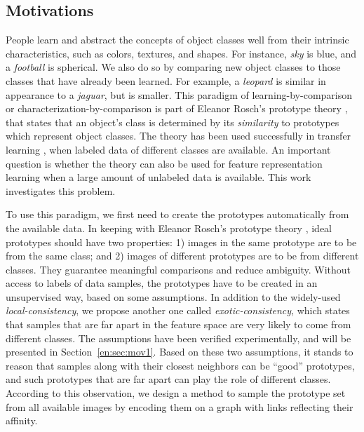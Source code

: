 \subsection{Motivations}
People learn and abstract the concepts of object classes well from
their intrinsic characteristics, such as colors, textures, and
shapes. For instance, \emph{sky} is blue, and a \emph{football} is
spherical. We also do so by comparing new object classes to those classes that
have already been learned. For example, a \emph{leopard} is similar in
appearance to a \emph{jaguar}, but is smaller. This paradigm of
learning-by-comparison or characterization-by-comparison is part of
Eleanor Rosch's prototype theory \citep{Rosch:1978}, that states that
an object's class is determined by its \emph{similarity} to prototypes
which represent object classes. The theory has been used successfully
in transfer learning \citep{Transfer:CVPR:08}, when labeled data of
different classes are available. An important question is whether the
theory can also be used for feature representation learning when a large
amount of unlabeled data is available. This work investigates this
problem.


To use this paradigm, we first need to create the prototypes
automatically from the available data. In
keeping with Eleanor Rosch's prototype theory \citep{Rosch:1978}, ideal
prototypes should have two properties: 1) images in the same prototype
are to be from the same class; and 2) images of different
prototypes are to be from different classes. They 
guarantee meaningful comparisons and reduce ambiguity.  Without
access to labels of data samples, the prototypes have to be created in
an unsupervised way, based on some assumptions. In addition to the
widely-used \emph{local-consistency}, we propose another one called
\emph{exotic-consistency}, which states that samples that are far
apart in the feature space are very likely to come from
different classes. The assumptions have been verified
experimentally, and will be presented in Section~\ref{en:sec:mov1}.  Based
on these two assumptions, it stands to reason that samples along with
their closest neighbors can be ``good'' prototypes, and  such
prototypes that are far apart can play the role of different classes.  According to
this observation, we design a method to sample the prototype set from
all available images by encoding them on a graph with links
reflecting their affinity.


